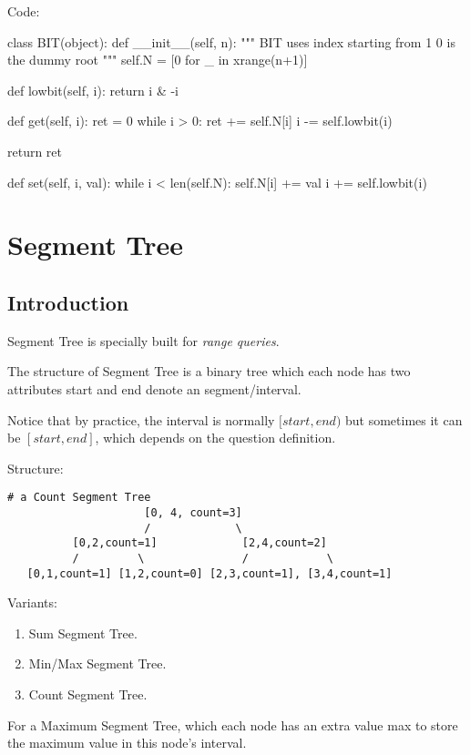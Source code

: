 Code:
\begin{python}
class BIT(object):
    def __init__(self, n):
        """
        BIT uses index starting from 1
        0 is the dummy root 
        """
        self.N = [0 for _ in xrange(n+1)]

    def lowbit(self, i):
        return i & -i

    def get(self, i):
        ret = 0
        while i > 0:
            ret += self.N[i]
            i -= self.lowbit(i)

        return ret
        
    def set(self, i, val):
        while i < len(self.N):
            self.N[i] += val
            i += self.lowbit(i)
\end{python}


\section{Segment Tree}\label{section:segmentTree}
\subsection{Introduction}
Segment Tree is specially built for \textit{range queries}. 

The structure of Segment Tree is a binary tree which each node has two attributes start and end denote an segment/interval. 

Notice that by practice, the interval is normally $[start, end)$ but sometimes it can be $[start, end]$, which depends on the question definition. 

Structure:  
\begin{lstlisting}[columns=flexible]
# a Count Segment Tree
                     [0, 4, count=3]
                     /             \
          [0,2,count=1]             [2,4,count=2]
          /         \               /            \
   [0,1,count=1] [1,2,count=0] [2,3,count=1], [3,4,count=1]
\end{lstlisting}
Variants:
\begin{enumerate}
\item Sum Segment Tree.
\item Min/Max Segment Tree.
\item Count Segment Tree. 
\end{enumerate}

For a Maximum Segment Tree, which each node has an extra value max to store the maximum value in this node's interval.

